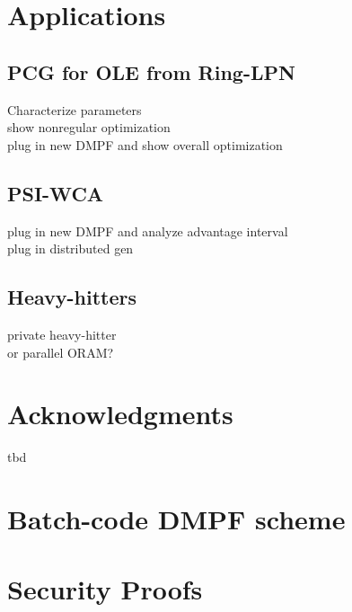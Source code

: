 \documentclass[sigconf]{acmart}
\begin{document}
\section{Applications}
\subsection{PCG for OLE from Ring-LPN}
Characterize parameters\\
show nonregular optimization\\
plug in new DMPF and show overall optimization
\subsection{PSI-WCA}
plug in new DMPF and analyze advantage interval\\
plug in distributed gen
\subsection{Heavy-hitters}
private heavy-hitter\\
or parallel ORAM?
\section{Acknowledgments}
tbd






\appendix
\section{Batch-code DMPF scheme}
\section{Security Proofs}
\end{document}
